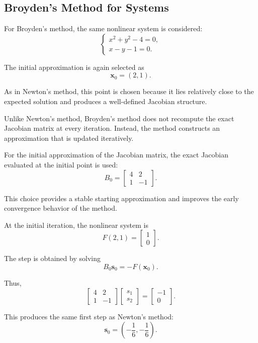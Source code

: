 \subsection{Broyden's Method for Systems}

For Broyden's method, the same nonlinear system is considered:
\begin{equation}
\begin{cases}
x^2 + y^2 - 4 = 0, \\
x - y - 1 = 0.
\end{cases}
\end{equation}

The initial approximation is again selected as
\[
\mathbf{x}_0=(2,1).
\]

As in Newton's method, this point is chosen because it lies relatively close to the expected solution and produces a well-defined Jacobian structure.

Unlike Newton's method, Broyden's method does not recompute the exact Jacobian matrix at every iteration. Instead, the method constructs an approximation that is updated iteratively.

For the initial approximation of the Jacobian matrix, the exact Jacobian evaluated at the initial point is used:
\[
B_0=
\begin{bmatrix}
4 & 2 \\
1 & -1
\end{bmatrix}.
\]

This choice provides a stable starting approximation and improves the early convergence behavior of the method.

At the initial iteration, the nonlinear system is
\[
F(2,1)=
\begin{bmatrix}
1 \\
0
\end{bmatrix}.
\]

The step is obtained by solving
\[
B_0\mathbf{s}_0
=
-F(\mathbf{x}_0).
\]

Thus,
\[
\begin{bmatrix}
4 & 2 \\
1 & -1
\end{bmatrix}
\begin{bmatrix}
s_1 \\
s_2
\end{bmatrix}
=
\begin{bmatrix}
-1 \\
0
\end{bmatrix}.
\]

This produces the same first step as Newton's method:
\[
\mathbf{s}_0=
\left(
-\frac16,
-\frac16
\right).
\]

